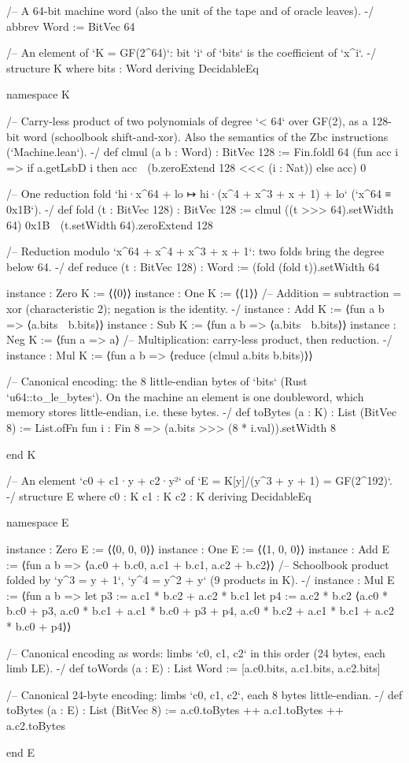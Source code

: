 \begin{leancode}[fontsize=\scriptsize,label={\footnotesize Contract/Field.lean}]
/-- A 64-bit machine word (also the unit of the tape and of oracle leaves). -/
abbrev Word := BitVec 64

/-- An element of `K = GF(2^64)`: bit `i` of `bits` is the coefficient of `x^i`. -/
structure K where
  bits : Word
  deriving DecidableEq

namespace K

/-- Carry-less product of two polynomials of degree `< 64` over GF(2), as a 128-bit word
(schoolbook shift-and-xor). Also the semantics of the Zbc instructions (`Machine.lean`). -/
def clmul (a b : Word) : BitVec 128 :=
  Fin.foldl 64 (fun acc i => if a.getLsbD i then acc ^^^ (b.zeroExtend 128 <<< (i : Nat)) else acc) 0

/-- One reduction fold `hi·x^64 + lo ↦ hi·(x^4 + x^3 + x + 1) + lo` (`x^64 ≡ 0x1B`). -/
def fold (t : BitVec 128) : BitVec 128 :=
  clmul ((t >>> 64).setWidth 64) 0x1B ^^^ (t.setWidth 64).zeroExtend 128

/-- Reduction modulo `x^64 + x^4 + x^3 + x + 1`: two folds bring the degree below 64. -/
def reduce (t : BitVec 128) : Word := (fold (fold t)).setWidth 64

instance : Zero K := ⟨⟨0⟩⟩
instance : One K := ⟨⟨1⟩⟩
/-- Addition = subtraction = xor (characteristic 2); negation is the identity. -/
instance : Add K := ⟨fun a b => ⟨a.bits ^^^ b.bits⟩⟩
instance : Sub K := ⟨fun a b => ⟨a.bits ^^^ b.bits⟩⟩
instance : Neg K := ⟨fun a => a⟩
/-- Multiplication: carry-less product, then reduction. -/
instance : Mul K := ⟨fun a b => ⟨reduce (clmul a.bits b.bits)⟩⟩

/-- Canonical encoding: the 8 little-endian bytes of `bits` (Rust `u64::to_le_bytes`). On the
machine an element is one doubleword, which memory stores little-endian, i.e. these bytes. -/
def toBytes (a : K) : List (BitVec 8) := List.ofFn fun i : Fin 8 => (a.bits >>> (8 * i.val)).setWidth 8

end K

/-- An element `c0 + c1·y + c2·y²` of `E = K[y]/(y^3 + y + 1) = GF(2^192)`. -/
structure E where
  c0 : K
  c1 : K
  c2 : K
  deriving DecidableEq

namespace E

instance : Zero E := ⟨⟨0, 0, 0⟩⟩
instance : One E := ⟨⟨1, 0, 0⟩⟩
instance : Add E := ⟨fun a b => ⟨a.c0 + b.c0, a.c1 + b.c1, a.c2 + b.c2⟩⟩
/-- Schoolbook product folded by `y^3 = y + 1`, `y^4 = y^2 + y` (9 products in K). -/
instance : Mul E := ⟨fun a b =>
  let p3 := a.c1 * b.c2 + a.c2 * b.c1
  let p4 := a.c2 * b.c2
  ⟨a.c0 * b.c0 + p3, a.c0 * b.c1 + a.c1 * b.c0 + p3 + p4, a.c0 * b.c2 + a.c1 * b.c1 + a.c2 * b.c0 + p4⟩⟩

/-- Canonical encoding as words: limbs `c0, c1, c2` in this order (24 bytes, each limb LE). -/
def toWords (a : E) : List Word := [a.c0.bits, a.c1.bits, a.c2.bits]

/-- Canonical 24-byte encoding: limbs `c0, c1, c2`, each 8 bytes little-endian. -/
def toBytes (a : E) : List (BitVec 8) := a.c0.toBytes ++ a.c1.toBytes ++ a.c2.toBytes

end E
\end{leancode}

